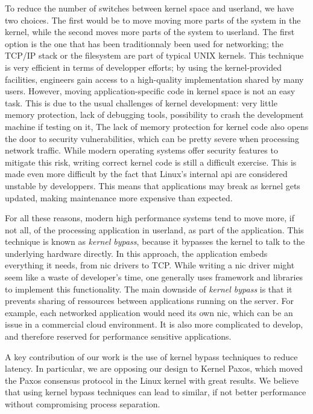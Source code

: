 To reduce the number of switches between kernel space and userland, we have two choices.
The first would be to move moving more parts of the system in the kernel, while the second moves more parts of the system to userland.
The first option is the one that has been traditionnaly been used for networking; the TCP/IP stack or the filesystem are part of typical UNIX kernels.
This technique is very efficient in terms of developper efforts; by using the kernel-provided facilities, engineers gain access to a high-quality implementation shared by many users.
However, moving application-specific code in kernel space is not an easy task.
This is due to the usual challenges of kernel development: very little memory protection, lack of debugging tools, possibility to crash the development machine if testing on it, \etc
The lack of memory protection for kernel code also opens the door to security vulnerabilities, which can be pretty severe when processing network traffic.
While modern operating systems offer security features to mitigate this risk\cite{kernel_self_protection}, writing correct kernel code is still a difficult exercise.
This is made even more difficult by the fact that Linux's internal \gls{api} are considered unstable by developpers.
This means that applications may break as kernel gets updated, making maintenance more expensive than expected.

For all these reasons, modern high performance systems tend to move more, if not all, of the processing application in userland, as part of the application.
This technique is known as \emph{kernel bypass}, because it bypasses the kernel to talk to the underlying hardware directly.
In this approach, the application embeds everything it needs, from \gls{nic} drivers to TCP.
While writing a \gls{nic} driver might seem like a waste of developer's time, one generally uses framework and libraries to implement this functionality.
The main downside of \emph{kernel bypass} is that it prevents sharing of ressources between applications running on the server.
For example, each networked application would need its own \gls{nic}, which can be an issue in a commercial cloud environment.
It is also more complicated to develop, and therefore reserved for performance sensitive applications. 

A key contribution of our work is the use of kernel bypass techniques to reduce latency.
In particular, we are opposing our design to Kernel Paxos\cite{kernelpaxos}, which moved the Paxos consensus protocol in the Linux kernel with great results.
We believe that using kernel bypass techniques can lead to similar, if not better performance without compromising process separation.
